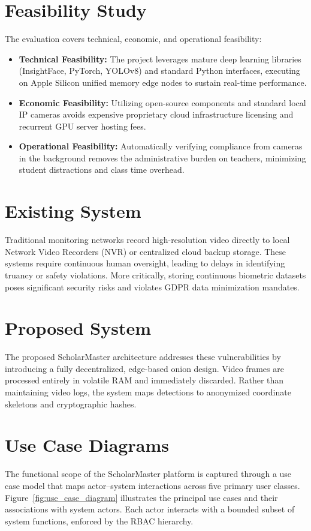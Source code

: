 \documentclass[12pt,a4paper,oneside]{report}
\begin{document}
\section{Feasibility Study}
The evaluation covers technical, economic, and operational feasibility:
\begin{itemize}
    \item \textbf{Technical Feasibility:} The project leverages mature deep learning libraries (InsightFace, PyTorch, YOLOv8) and standard Python interfaces, executing on Apple Silicon unified memory edge nodes to sustain real-time performance.
    \item \textbf{Economic Feasibility:} Utilizing open-source components and standard local IP cameras avoids expensive proprietary cloud infrastructure licensing and recurrent GPU server hosting fees.
    \item \textbf{Operational Feasibility:} Automatically verifying compliance from cameras in the background removes the administrative burden on teachers, minimizing student distractions and class time overhead.
\end{itemize}

\section{Existing System}
Traditional monitoring networks record high-resolution video directly to local Network Video Recorders (NVR) or centralized cloud backup storage. These systems require continuous human oversight, leading to delays in identifying truancy or safety violations. More critically, storing continuous biometric datasets poses significant security risks and violates GDPR data minimization mandates.

\section{Proposed System}
The proposed ScholarMaster architecture addresses these vulnerabilities by introducing a fully decentralized, edge-based onion design. Video frames are processed entirely in volatile RAM and immediately discarded. Rather than maintaining video logs, the system maps detections to anonymized coordinate skeletons and cryptographic hashes.

\section{Use Case Diagrams}
The functional scope of the ScholarMaster platform is captured through a use case model that maps actor--system interactions across five primary user classes. Figure~\ref{fig:use_case_diagram} illustrates the principal use cases and their associations with system actors. Each actor interacts with a bounded subset of system functions, enforced by the RBAC hierarchy.
\end{document}
